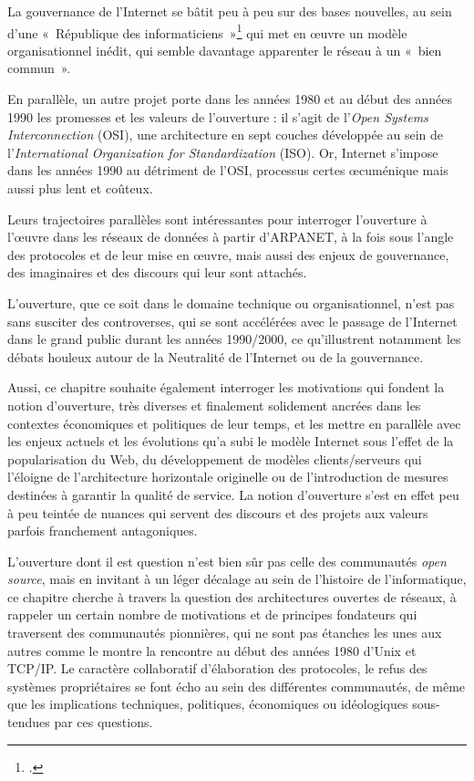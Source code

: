 \documentclass{FramateX}
\begin{document}
\begin{refsection}
La gouvernance de l'Internet se bâtit peu à peu sur des
bases nouvelles, au sein d'une «~République des
informaticiens~»\footnote{\cite[p.~90]{flichyinternet1999}.} qui met en œuvre un modèle organisationnel inédit, qui
semble davantage apparenter le réseau à un «~bien commun~». 

En parallèle, un autre projet porte dans les années 1980 et au début des
années 1990 les promesses et les valeurs de
l'ouverture : il s'agit de
l'\textit{Open Systems Interconnection} (OSI), une
architecture en sept couches développée au sein de
l'\textit{International Organization for
Standardization} (ISO). Or, Internet s'impose dans les
années 1990 au détriment de l'OSI, processus certes
œcuménique mais aussi plus lent et coûteux. 

Leurs trajectoires parallèles sont intéressantes pour interroger
l'ouverture à l'œuvre dans les
réseaux de données à partir d'ARPANET, à la fois sous l'angle des protocoles et de leur mise
en œuvre, mais aussi des enjeux de gouvernance, des imaginaires et des discours qui leur sont attachés.

L'ouverture, que ce soit dans le domaine technique ou
organisationnel, n'est pas sans susciter des
controverses, qui se sont accélérées avec le passage de
l'Internet dans le grand public durant les années
1990/2000, ce qu'illustrent notamment les débats
houleux autour de la Neutralité de l'Internet ou de la
gouvernance.

Aussi, ce chapitre souhaite également interroger les motivations qui
fondent la notion d'ouverture, très diverses et
finalement solidement ancrées dans les contextes économiques et
politiques de leur temps, et les mettre en parallèle avec les enjeux
actuels et les évolutions qu'a subi le modèle Internet
sous l'effet de la popularisation du Web, du
développement de modèles clients/serveurs qui
l'éloigne de l'architecture
horizontale originelle ou de l'introduction de mesures
destinées à garantir la qualité de service. La notion
d'ouverture s'est en effet peu à peu
teintée de nuances qui servent des discours et des projets aux valeurs
parfois franchement antagoniques. 

L'ouverture dont il est question n'est
bien sûr pas celle des communautés \textit{open source}, mais en invitant à
un léger décalage au sein de l'histoire de
l'informatique, ce chapitre cherche à travers la
question des architectures ouvertes de réseaux, à rappeler un certain
nombre de motivations et de principes fondateurs qui traversent des
communautés pionnières, qui ne sont pas étanches les unes aux autres
comme le montre la rencontre au début des années 1980
d'Unix et TCP/IP. Le caractère collaboratif
d'élaboration des protocoles, le refus des systèmes
propriétaires se font écho au sein des différentes communautés, de même
que les implications techniques, politiques, économiques ou
idéologiques sous-tendues par ces questions. 


\end{refsection}
\end{document}
